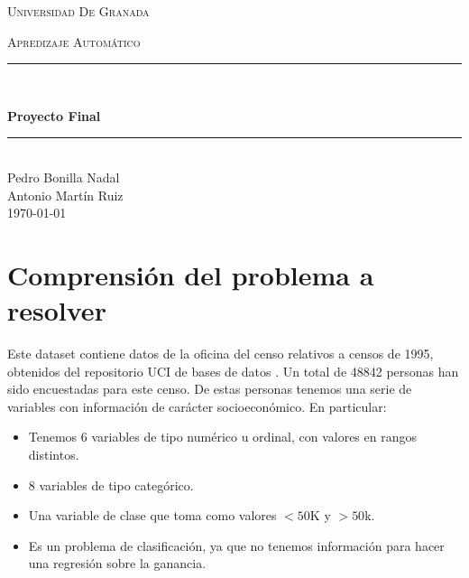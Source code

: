 \documentclass[11pt,a4paper]{article}
\date{\today}
\begin{document}
\begin{titlepage}
\begin{center}

\vspace*{.06\textheight}
{\scshape\LARGE Universidad De Granada\par}\vspace{1.5cm} %
\textsc{\Large Apredizaje Automático}\\[0.5cm] %

\rule{\textwidth}{0.4mm} \\[0.4cm] %
{\huge \bfseries Proyecto Final\par}\vspace{0.4cm} %

\rule{\textwidth}{0.4mm} \\[11.5cm] %
 {\Large Pedro Bonilla Nadal\\Antonio Martín Ruiz}\\[1cm]

 {\today}

\vfill
\end{center}
\end{titlepage}

\setcounter{tocdepth}{2}
\tableofcontents
\newpage



\section{Comprensión del problema a resolver }

Este dataset contiene datos de la oficina del censo\cite{census} relativos a censos de 1995, obtenidos del repositorio UCI de bases de datos \cite{uci}. Un total de 48842 personas han sido encuestadas para este censo. De estas personas tenemos una serie de variables con información de carácter socioeconómico. En particular:
\begin{itemize}
\item Tenemos 6 variables de tipo numérico u ordinal, con valores en rangos distintos.
\item 8 variables de tipo categórico.
\item Una variable de clase que toma como valores $<50$K y $>50$k.
\item Es un problema de clasificación, ya que no tenemos información para hacer una regresión sobre la ganancia.
\end{itemize}
\end{document}
